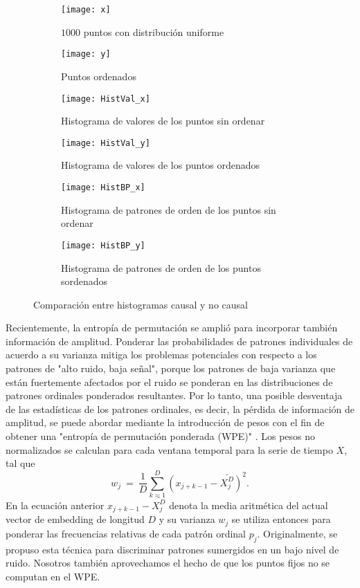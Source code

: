 \begin{figure}[htpb]
	\centering
	\begin{subfigure}[t]{0.49\textwidth}
		\texttt{[image: x]}
		\caption{$1000$ puntos con distribución uniforme}
		\label{subfig:causal_nocausal_x}
	\end{subfigure}
	\begin{subfigure}[t]{0.49\textwidth}
		\texttt{[image: y]}
		\caption{Puntos ordenados}
		\label{subfig:causal_nocausal_y}
	\end{subfigure}
	\begin{subfigure}[t]{0.49\textwidth}
		\texttt{[image: HistVal\_x]}
		\caption{Histograma de valores de los puntos sin ordenar}
		\label{subfig:causal_nocausal_HistValx}
	\end{subfigure}
	\begin{subfigure}[t]{0.49\textwidth}
		\texttt{[image: HistVal\_y]}
		\caption{Histograma de valores de los puntos ordenados}
		\label{subfig:causal_nocausal_HistValy}
	\end{subfigure}
	\begin{subfigure}[t]{0.49\textwidth}
		\texttt{[image: HistBP\_x]}
		\caption{Histograma de patrones de orden de los puntos sin ordenar}
		\label{subfig:causal_nocausal_HistBPx}
	\end{subfigure}
	\begin{subfigure}[t]{0.49\textwidth}
		\texttt{[image: HistBP\_y]}
		\caption{Histograma de patrones de orden de los puntos sordenados}
		\label{subfig:causal_nocausal_HistBPy}
	\end{subfigure}
	\caption{Comparación entre histogramas causal y no causal}\label{fig:causal_nocausal}
\end{figure}

Recientemente, la entropía de permutación se amplió para incorporar también información de amplitud.
Ponderar las probabilidades de patrones individuales de acuerdo a su varianza mitiga los problemas potenciales con respecto a los patrones de "alto ruido, baja señal", porque los patrones de baja varianza que están fuertemente afectados por el ruido se ponderan en las distribuciones de patrones ordinales ponderados resultantes.
Por lo tanto, una posible desventaja de las estadísticas de los patrones ordinales, es decir, la pérdida de información de amplitud, se puede abordar mediante la introducción de pesos con el fin de obtener una "entropía de permutación ponderada (WPE)" \cite{Fadlallah2013}.
Los pesos no normalizados se calculan para cada ventana temporal para la serie de tiempo $X$, tal que
\begin{equation}
\label{WPE_weigth}
w_j~=~\frac{1}{D}\sum_{k=1}^{D} \left(x_{j+k-1}-\bar{X_j^D}\right)^2.
\end{equation}
En la ecuación anterior $x_{j+k-1}-\bar{X_j^D}$ denota la media aritmética del actual vector de embedding de longitud $D$ y su varianza $w_j$ se utiliza entonces para ponderar las frecuencias relativas de cada patrón ordinal $p_j$.
Originalmente, se propuso esta técnica para discriminar patrones sumergidos en un bajo nivel de ruido.
Nosotros también aprovechamos el hecho de que los puntos fijos no se computan en el WPE.

